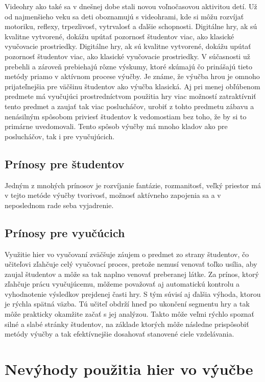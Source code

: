 \documentclass[10pt,twoside,slovak,a4paper]{article}
\begin{document}
Videohry ako také sa v dnešnej dobe stali novou voľnočasovou aktivitou detí. Už od najmenšieho veku sa deti oboznamujú s videohrami, kde si môžu rozvíjať motoriku, reflexy, trpezlivosť, vytrvalosť a ďalšie schopnosti\cite{Chen2012-ao}. Digitálne hry, ak sú kvalitne vytvorené, dokážu upútať pozornosť študentov viac, ako klasické vyučovacie prostriedky. Digitálne hry, ak sú kvalitne vytvorené, dokážu upútať pozornosť študentov viac, ako klasické vyučovacie prostriedky. V súčasnosti už prebehli a zároveň prebiehajú rôzne výskumy, ktoré skúmajú čo prinášajú tieto metódy priamo v aktívnom procese výučby. Je známe, že výučba hrou je omnoho prijateľnejšia pre väčšinu študentov ako výučba klasická. Aj pri menej obľúbenom predmete má vyučujúci prostredníctvom použitia hry viac možností zatraktívniť tento predmet a zaujať tak viac poslucháčov, urobiť z tohto predmetu zábavu a nenásilným spôsobom priviesť študentov k vedomostiam bez toho, že by si to primárne uvedomovali. Tento spôsob výučby má mnoho kladov ako pre poslucháčov, tak i pre vyučujúcich.

\subsection{Prínosy pre študentov} \label{vyhody:studenti}

Jedným z mnohých prínosov je rozvíjanie fantázie, rozmanitosť, veľký priestor má v tejto metóde výučby tvorivosť, možnosť aktívneho zapojenia sa a v neposlednom rade seba vyjadrenie.

\subsection{Prínosy pre vyučúcich} \label{vyhody:vyucujuci}

Využitie hier vo vyučovaní zväčšuje záujem o predmet zo strany študentov\cite{Ucenie}, čo učiteľovi zľahčuje celý vyučovací proces, pretože nemusí venovať toľko usília, aby zaujal študentov a môže sa tak naplno venovať preberanej látke. Za prínos, ktorý zľahčuje prácu vyučujúcemu, môžeme považovať aj automatickú kontrolu a vyhodnotenie výsledkov prejdenej časti hry. S tým súvisí aj ďalšia výhoda, ktorou je rýchla spätná väzba. Tú učiteľ obdrží hneď po ukončení segmentu hry a tak môže prakticky okamžite začať s jej analýzou. Takto môže veľmi rýchlo spoznať silné a slabé stránky študentov, na základe ktorých môže následne prispôsobiť metódy výučby a tak efektívnejšie dosahovať stanovené ciele vzdelávania.

\section{Nevýhody použitia hier vo výučbe} \label{nevyhody}
\end{document}
